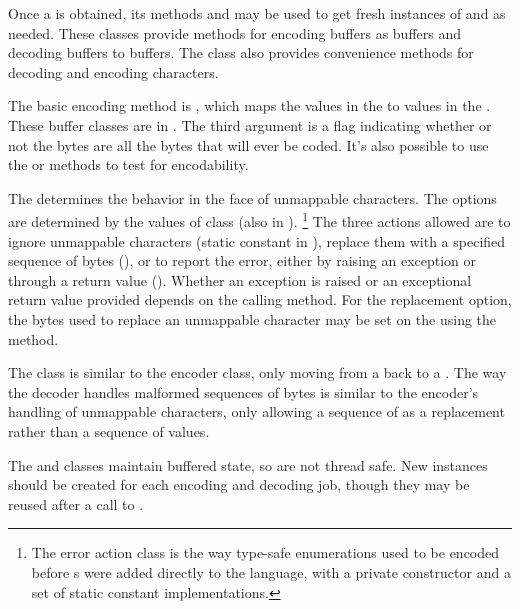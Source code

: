 Once a  is obtained, its methods  and
 may be used to get fresh instances of
 and  as needed. These classes
provide methods for encoding  buffers as 
buffers and decoding  buffers to  buffers.  The
 class also provides convenience methods for decoding
and encoding characters.

The basic encoding method is
, which maps the
 values in the  to  values in
the .  These buffer classes are in .
The third argument is a flag indicating whether or not the bytes are
all the bytes that will ever be coded.  It's also possible to use the
 or  methods to
test for encodability.  

The  determines the behavior in the face of
unmappable characters.  The options are determined by the values of
class  (also in ).%
%
\footnote{The error action class is the way type-safe enumerations used to
be encoded before s were added directly to the language, with
a private constructor and a set of static constant implementations.}%
%
The three actions allowed are to ignore unmappable characters (static
constant  in ), replace them with
a specified sequence of bytes (), or to report the
error, either by raising an exception or through a return value
().  Whether an exception is raised or an exceptional return
value provided depends on the calling method.  For the replacement option,
the bytes used to replace an unmappable character may be set on the
 using the  method.

The  class is similar to the encoder class, only
moving from a  back to a .  The way
the decoder handles malformed sequences of bytes is similar to the
encoder's handling of unmappable characters, only allowing a sequence
of  as a replacement rather than a sequence of 
values.

The  and  classes maintain
buffered state, so are not thread safe.  New instances should be
created for each encoding and decoding job, though they may be reused
after a call to .



